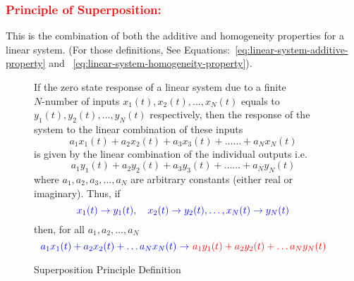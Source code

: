 \documentclass[../notes-main.tex]{subfiles}
\begin{document}
\subsubsection{\textcolor{red}{Principle of Superposition:}}
This is the combination of both the additive and homogeneity properties for a linear system. (For those definitions, See Equations:~\ref{eq:linear-system-additive-property} and ~\ref{eq:linear-system-homogeneity-property}).
\begin{figure}[H]
    \centering
    \begin{mdframed}
        \begin{center}
            If the zero state response of a linear system due to a finite \(N\text{-number}\) of inputs \(x_1(t), x_2(t), \dots, x_N(t)\) equals to \(y_1(t), y_2(t), \dots, y_N(t)\) respectively, then the response of the system to the linear combination of these inputs
            \begin{equation}
                a_1x_1(t) + a_2x_2(t) + a_3x_3(t) + \dots\dots + a_Nx_N(t)
                \label{eq:linear-system-superposition-input}
            \end{equation}
            \noindent is given by the linear combination of the individual outputs i.e.
            \begin{equation}
                a_1y_1(t) + a_2y_2(t) + a_3y_3(t) + \dots\dots + a_Ny_N(t)
                \label{eq:linear-system-superposition-output}
            \end{equation}
            \noindent where \(a_1, a_2, a_3, \dots, a_N\) are arbitrary constants (either real or imaginary).   
            Thus, if 
            \begin{equation}
                \textcolor{blue}{x_1(t) \rightarrow y_1(t), \quad x_2(t) \rightarrow y_2(t), \dots, x_N(t) \rightarrow y_N(t)}
                \label{eq:linear-system-superposition-def-eq-1}
            \end{equation}
            then, for all \(a_1, a_2, \dots, a_N\)
            \begin{equation}
                \textcolor{blue}{a_1x_1(t) + a_2x_2(t) + \ldots  a_Nx_N(t)\rightarrow}\ \textcolor{red}{ a_1y_1(t) + a_2y_2(t) + \ldots  a_Ny_N(t)}
                \label{eq:linear-system-superposition-def-eq-2}
            \end{equation}          
        \end{center}
    \end{mdframed}\label{fig:linear-system-superposition-def-1}
    \vspace{-1em}\caption{Superposition Principle Definition}
\end{figure}
\end{document}
